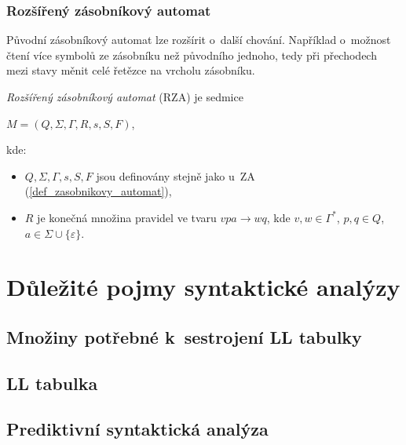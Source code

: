 \subsection*{Rozšířený zásobníkový automat}\label{kap_rozsireny_ZA}
Původní zásobníkový automat lze rozšírit o~další chování. Například o~možnost čtení více symbolů ze zásobníku než původního jednoho, tedy při přechodech mezi stavy měnit celé řetězce na vrcholu zásobníku.

\begin{definition}
    \emph{Rozšířený zásobníkový automat} (RZA) je sedmice
    \begin{center}
        $M = (Q, \Sigma, \Gamma, R, s, S, F)$,
    \end{center}
    kde:
    \begin{itemize}
        \item $Q, \Sigma, \Gamma, s, S, F$ jsou definovány stejně jako u~ZA (\ref{def_zasobnikovy_automat}),
        \item $R$ je konečná množina pravidel ve tvaru $vpa \rightarrow wq$, kde $v, w \in \Gamma^*$, $p, q \in Q$, $a \in \Sigma \cup \{\varepsilon\}$.
    \end{itemize}
\end{definition}

\chapter{Důležité pojmy syntaktické analýzy }\label{5_teorie_sa}




\section{Množiny potřebné k~sestrojení LL tabulky}

\section{LL tabulka}





\section{Prediktivní syntaktická analýza}

